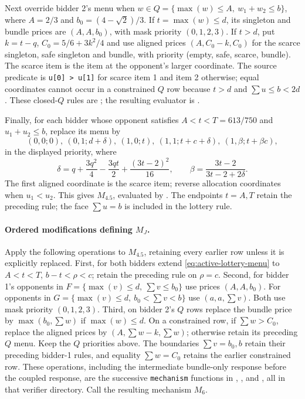 Next override bidder 2's menu when
$w\in Q=\{\max(w)\le A,\ w_1+w_2\le b\}$, where $A=2/3$ and
$b_0=(4-\sqrt2)/3$. If $t=\max(w)\le d$, its singleton and bundle prices
are $(A,A,b_0)$, with mask priority $(0,1,2,3)$. If $t>d$, put
$k=t-q$, $C_0=5/6+3k^2/4$ and use aligned prices
$(A,C_0-k,C_0)$ for the scarce singleton, safe singleton and bundle,
with priority (empty, safe, scarce, bundle). The scarce item is the item
at the opponent's larger coordinate. The source predicate is
\texttt{u[0] > u[1]} for scarce item 1 and item 2 otherwise; equal
coordinates cannot occur in a constrained $Q$ row because $t>d$ and
$\sum u\le b<2d$. These closed-$Q$ rules are
; the resulting evaluator is
.

Finally, for each bidder whose opponent satisfies
$A<t<T=613/750$ and $u_1+u_2\le b$, replace its menu by
\begin{equation}\label{eq:active-lottery-menu}
 (0,0;0),\ (0,1;d+\delta),\ (1,0;t),\ (1,1;t+c+\delta),\
 (1,\beta;t+\beta c),
\end{equation}
in the displayed priority, where
\[
 \delta=q+\frac{3q^2}{4}-\frac{3qt}{2}+\frac{(3t-2)^2}{16},
 \qquad \beta=\frac{3t-2}{3t-2+2\delta}.
\]
The first aligned coordinate is the scarce item; reverse allocation
coordinates when $u_1<u_2$. This gives $M_{4.5}$, evaluated by
.
The endpoints $t=A,T$ retain the preceding rule; the face $\sum u=b$
is included in the lottery rule.

\paragraph{Ordered modifications defining $M_J$.}
Apply the following operations to $M_{4.5}$, retaining every earlier row
unless it is explicitly replaced. First, for both bidders extend
\eqref{eq:active-lottery-menu} to $A<t<T$, $b-t<\rho<c$; retain the
preceding rule on $\rho=c$. Second, for bidder 1's opponents in
$F=\{\max(v)\le d,\ \sum v\le b_0\}$ use prices $(A,A,b_0)$.
For opponents in $G=\{\max(v)\le d,\ b_0<\sum v<b\}$ use
$(a,a,\sum v)$. Both use mask priority $(0,1,2,3)$.
Third, on bidder 2's $Q$ rows replace the bundle price by
$\max(b_0,\sum w)$ if $\max(w)\le d$.
On a constrained row, if $\sum w>C_0$, replace the aligned prices by
$(A,\sum w-k,\sum w)$; otherwise retain its preceding $Q$ menu.
Keep the $Q$ priorities above. The boundaries $\sum v=b_0,b$ retain their
preceding bidder-1 rules, and equality $\sum w=C_0$ retains the earlier
constrained row. These operations, including the intermediate bundle-only
response before the coupled response, are the successive
\texttt{mechanism} functions in
,
,  and
, all in that verifier directory.
Call the resulting mechanism $M_6$.

